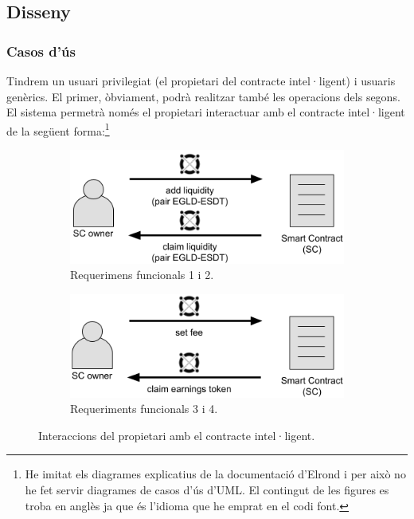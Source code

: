 \documentclass[11pt,a4paper]{article}
\begin{document}
\subsection{Disseny}

\subsubsection{Casos d'ús}

Tindrem un usuari privilegiat (el propietari del contracte intel·ligent) i usuaris genèrics. El primer, òbviament, podrà realitzar també les operacions dels segons. El sistema permetrà només el propietari interactuar amb el contracte intel·ligent de la següent forma:{\footnote{He imitat els diagrames explicatius de la documentació d'Elrond \cite{elrond2022} i per això no he fet servir diagrames de casos d'ús d'UML. El contingut de les figures es troba en anglès ja que és l'idioma que he emprat en el codi font.}}

\begin{figure}[!htb]
\begin{subfigure}[b]{0.485\textwidth}
  \includegraphics[width=\linewidth]{cu_add_claim_liquidity.png}
  \caption{Requerimens funcionals 1 i 2.}\label{fig:addclaimliq}
\end{subfigure}\hfill
\begin{subfigure}[b]{0.49\textwidth}
  \includegraphics[width=\linewidth]{cu_set_fee_claim_earnings.png}
  \caption{Requeriments funcionals 3 i 4.}\label{fig:setfeeclaim}
\end{subfigure}\hfill
\caption{Interaccions del propietari amb el contracte intel·ligent.}
\end{figure}
\end{document}
